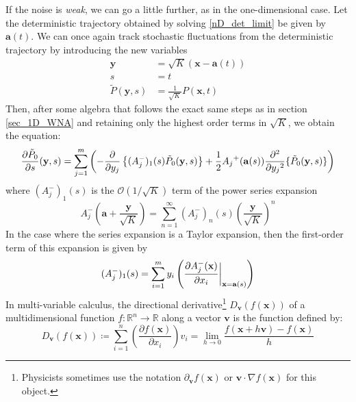 If the noise is \emph{weak}, we can go a little further, as in the one-dimensional case. Let the deterministic trajectory obtained by solving \eqref{nD_det_limit} be given by $\mathbf{a}(t)$.  We can once again track 
stochastic fluctuations from the deterministic trajectory by introducing the new variables
\begin{equation}
\begin{aligned}
\mathbf{y} &= \sqrt{K}(\mathbf{x} - \mathbf{a}(t))\\
s&=t\\
\tilde{P}(\mathbf{y},s) &= \frac{1}{\sqrt{K}}P(\mathbf{x},t)
\end{aligned}
\end{equation}
Then, after some algebra that follows the exact same steps as in section \ref{sec_1D_WNA} and retaining only the highest order terms in $\sqrt{K}$, we obtain the equation:
\begin{equation}
\label{nD_WNA_intermediate}
\frac{\partial \Tilde{P}_{0}}{\partial s}(\mathbf{y},s) = \sum\limits_{j=1}^{m}\left(-\frac{\partial}{\partial y_j}\left\{(A^{-}_{j})_{1}(s)\Tilde{P}_{0}(\mathbf{y},s)\right\}+\frac{1}{2}{A_j}^{+}(\mathbf{a}(s))\frac{\partial^2}{\partial{y_j}^2}\{\Tilde{P}_{0}(\mathbf{y},s)\}\right)
\end{equation}
where $(A^{-}_{j})_{1}(s)$ is the $\mathcal{O}(1/\sqrt{K})$ term of the power series expansion
\begin{equation*}
A^-_{j}(\mathbf{a} + \frac{\mathbf{y}}{\sqrt{K}}) = \sum\limits_{n=1}^{\infty}(A^{-}_{j})_{n}(s)\left(\frac{\mathbf{y}}{\sqrt{K}}\right)^n
\end{equation*}
In the case where the series expansion is a Taylor expansion, then the first-order term of this expansion is given by
\begin{equation}
\label{nD_WNA_taylor_term}
(A^{-}_{j})_{1}(s) = \sum\limits_{i=1}^{m} y_i\left(\frac{\partial A^{-}_j(\mathbf{x})}{\partial x_i}\bigg{|}_{\mathbf{x}=\mathbf{a}(s)}\right)
\end{equation}
In multi-variable calculus, the directional derivative\footnote{Physicists sometimes use the notation $\partial_{\mathbf{v}}f(\mathbf{x})$ or $\mathbf{v}\cdot\nabla f(\mathbf{x})$ for this object.} $D_{\mathbf{v}}(f(\mathbf{x}))$ of a multidimensional function $f: \mathbb{R}^n \to \mathbb{R}$ along a vector $\mathbf{v}$ is the function defined by:
\begin{equation}
\label{directional_derivative_defn}
D_{\mathbf{v}}(f(\mathbf{x})) \coloneqq \sum\limits_{i=1}^{n}\left(\frac{\partial f(\mathbf{x})}{\partial x_i}\right)v_i = \lim_{h \to 0}\frac{f(\mathbf{x}+h\mathbf{v})-f(\mathbf{x})}{h}
\end{equation}
